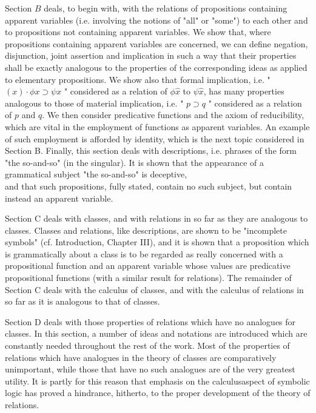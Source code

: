 \documentclass[10pt]{article}
\begin{document}
Section $B$ deals, to begin with, with the relations of propositions containing apparent variables (i.e. involving the notions of "all" or "some") to each other and to propositions not containing apparent variables. We show that, where propositions containing apparent variables are concerned, we can define negation, disjunction, joint assertion and implication in such a way that their properties shall be exactly analogous to the properties of the corresponding ideas as applied to elementary propositions. We show also that formal implication, i.e. " $(x) \cdot \phi x \supset \psi x$ " considered as a relation of $\phi \hat{x}$ to $\psi \hat{x}$, has many properties analogous to those of material implication, i.e. " $p \supset q$ " considered as a relation of $p$ and $q$. We then consider predicative functions and the axiom of reducibility, which are vital in the employment of functions as apparent variables. An example of such employment is afforded by identity, which is the next topic considered in Section B. Finally, this section deals with descriptions, i.e. phrases of the form "the so-and-so" (in the singular). It is shown that the appearance of a grammatical subject "the so-and-so" is deceptive,\\
and that such propositions, fully stated, contain no such subject, but contain instead an apparent variable.

Section C deals with classes, and with relations in so far as they are analogous to classes. Classes and relations, like descriptions, are shown to be "incomplete symbols" (cf. Introduction, Chapter III), and it is shown that a proposition which is grammatically about a class is to be regarded as really concerned with a propositional function and an apparent variable whose values are predicative propositional functions (with a similar result for relations). The remainder of Section C deals with the calculus of classes, and with the calculus of relations in so far as it is analogous to that of classes.

Section D deals with those properties of relations which have no analogues for classes. In this section, a number of ideas and notations are introduced which are constantly needed throughout the rest of the work. Most of the properties of relations which have analogues in the theory of classes are comparatively unimportant, while those that have no such analogues are of the very greatest utility. It is partly for this reason that emphasis on the calculusaspect of symbolic logic has proved a hindrance, hitherto, to the proper development of the theory of relations.
\end{document}
